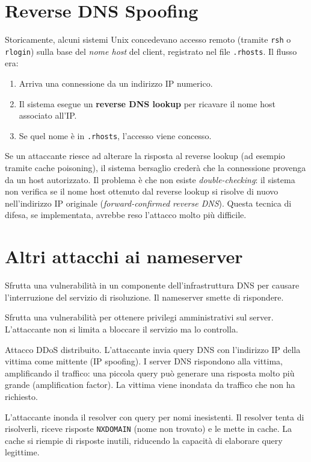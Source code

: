 \documentclass{article}
\begin{document}
\section*{Reverse DNS Spoofing}

Storicamente, alcuni sistemi Unix concedevano accesso remoto (tramite
\texttt{rsh} o \texttt{rlogin}) sulla base del \emph{nome host} del client,
registrato nel file \texttt{.rhosts}. Il flusso era:

\begin{enumerate}[label=\textbf{\arabic*.}]
    \item Arriva una connessione da un indirizzo IP numerico.
    \item Il sistema esegue un \textbf{reverse DNS lookup} per ricavare il
        nome host associato all'IP.
    \item Se quel nome è in \texttt{.rhosts}, l'accesso viene concesso.
\end{enumerate}

Se un attaccante riesce ad alterare la risposta al reverse lookup (ad esempio
tramite cache poisoning), il sistema bersaglio crederà che la connessione
provenga da un host autorizzato. Il problema è che non esiste
\emph{double-checking}: il sistema non verifica se il nome host ottenuto
dal reverse lookup si risolve di nuovo nell'indirizzo IP originale
(\emph{forward-confirmed reverse DNS}). Questa tecnica di difesa, se
implementata, avrebbe reso l'attacco molto più difficile.


\section*{Altri attacchi ai nameserver}

\begin{description}[leftmargin=3cm, style=nextline]
    \item[DOS ``exploit to fail''] Sfrutta una vulnerabilità in un componente
        dell'infrastruttura DNS per causare l'interruzione del servizio di
        risoluzione. Il nameserver smette di rispondere.

    \item[DOS ``exploit to own''] Sfrutta una vulnerabilità per ottenere
        privilegi amministrativi sul server. L'attaccante non si limita a
        bloccare il servizio ma lo controlla.

    \item[Reflection \& Amplification] Attacco DDoS distribuito. L'attaccante
        invia query DNS con l'indirizzo IP della vittima come mittente
        (IP spoofing). I server DNS rispondono alla vittima, amplificando il
        traffico: una piccola query può generare una risposta molto più grande
        (amplification factor). La vittima viene inondata da traffico che
        non ha richiesto.

    \item[Cache exhaustion] L'attaccante inonda il resolver con query per nomi
        inesistenti. Il resolver tenta di risolverli, riceve risposte
        \texttt{NXDOMAIN} (nome non trovato) e le mette in cache. La cache
        si riempie di risposte inutili, riducendo la capacità di elaborare
        query legittime.
\end{description}
\end{document}
